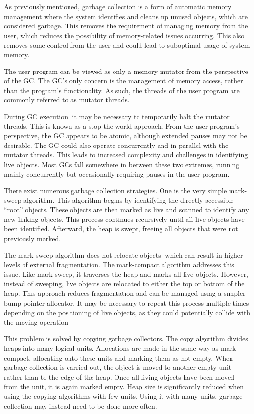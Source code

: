 As previously mentioned, garbage collection is a form of automatic memory management where the system identifies and cleans up unused objects, which are considered garbage. This removes the requirement of managing memory from the user, which reduces the possibility of memory-related issues occurring. This also removes some control from the user and could lead to suboptimal usage of system memory.

The user program can be viewed as only a memory mutator from the perspective of the GC. The GC's only concern is the management of memory access, rather than the program's functionality. As such, the threads of the user program are commonly referred to as mutator threads. 

During GC execution, it may be necessary to temporarily halt the mutator threads. This is known as a stop-the-world approach. From the user program's perspective, the GC appears to be atomic, although extended pauses may not be desirable. The GC could also operate concurrently and in parallel with the mutator threads. This leads to increased complexity and challenges in identifying live objects. Most GCs fall somewhere in between these two extremes, running mainly concurrently but occasionally requiring pauses in the user program.

There exist numerous garbage collection strategies. One is the very simple mark-sweep algorithm. This algorithm begins by identifying the directly accessible ``root'' objects. These objects are then marked as live and scanned to identify any new linking objects. This process continues recursively until all live objects have been identified. Afterward, the heap is swept, freeing all objects that were not previously marked.

The mark-sweep algorithm does not relocate objects, which can result in higher levels of external fragmentation. The mark-compact algorithm addresses this issue. Like mark-sweep, it traverses the heap and marks all live objects. However, instead of sweeping, live objects are relocated to either the top or bottom of the heap. This approach reduces fragmentation and can be managed using a simpler bump-pointer allocator. It may be necessary to repeat this process multiple times depending on the positioning of live objects, as they could potentially collide with the moving operation.

This problem is solved by copying garbage collectors. The copy algorithm divides heaps into many logical units. Allocations are made in the same way as mark-compact, allocating onto these units and marking them as not empty. When garbage collection is carried out, the object is moved to another empty unit rather than to the edge of the heap. Once all living objects have been moved from the unit, it is again marked empty. Heap size is significantly reduced when using the copying algorithms with few units. Using it with many units, garbage collection may instead need to be done more often.

